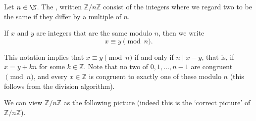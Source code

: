 \documentclass[a4paper]{scrartcl}
\begin{document}
\begin{definition}
	Let $n \in \N$. The , written $\mathbb{Z}/n\mathbb{Z}$ consist of the integers where we regard two to be the same if they differ by a multiple of $n$.
\end{definition}

\begin{definition}
	If $x$ and $y$ are integers that are the same modulo $n$, then we write
	$$
	x \equiv y \pmod{n}.
	$$
\end{definition}

This notation implies that $x \equiv y \pmod{n}$ if and only if $n \mid x - y$, that is, if $x = y + kn$ for some $k \in \mathbb{Z}$.
Note that no two of $0, 1, \dots, n - 1$ are congruent $\pmod{n}$, and every $x \in \mathbb{Z}$ is congruent to exactly one of these modulo $n$ (this follows from the division algorithm).

We can view $\mathbb{Z}/n\mathbb{Z}$ as the following picture (indeed this is the `correct picture' of $\mathbb{Z}/n\mathbb{Z}$).
\end{document}
